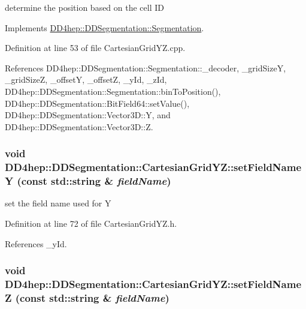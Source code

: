 determine the position based on the cell ID 

Implements \hyperlink{class_d_d4hep_1_1_d_d_segmentation_1_1_segmentation_a594fe6d78667415855858d083b64acad}{DD4hep::DDSegmentation::Segmentation}.

Definition at line 53 of file CartesianGridYZ.cpp.

References DD4hep::DDSegmentation::Segmentation::\_\-decoder, \_\-gridSizeY, \_\-gridSizeZ, \_\-offsetY, \_\-offsetZ, \_\-yId, \_\-zId, DD4hep::DDSegmentation::Segmentation::binToPosition(), DD4hep::DDSegmentation::BitField64::setValue(), DD4hep::DDSegmentation::Vector3D::Y, and DD4hep::DDSegmentation::Vector3D::Z.\hypertarget{class_d_d4hep_1_1_d_d_segmentation_1_1_cartesian_grid_y_z_abd0b24749554d02acb6fb5ffa5e15335}{
\subsubsection[{setFieldNameY}]{\setlength{\rightskip}{0pt plus 5cm}void DD4hep::DDSegmentation::CartesianGridYZ::setFieldNameY (const std::string \& {\em fieldName})}}
\label{class_d_d4hep_1_1_d_d_segmentation_1_1_cartesian_grid_y_z_abd0b24749554d02acb6fb5ffa5e15335}


set the field name used for Y 

Definition at line 72 of file CartesianGridYZ.h.

References \_\-yId.\hypertarget{class_d_d4hep_1_1_d_d_segmentation_1_1_cartesian_grid_y_z_ad6d2428895d3f1842bd4d6add72658d2}{
\subsubsection[{setFieldNameZ}]{\setlength{\rightskip}{0pt plus 5cm}void DD4hep::DDSegmentation::CartesianGridYZ::setFieldNameZ (const std::string \& {\em fieldName})}}
\label{class_d_d4hep_1_1_d_d_segmentation_1_1_cartesian_grid_y_z_ad6d2428895d3f1842bd4d6add72658d2}


